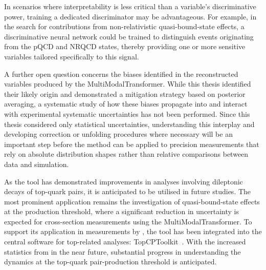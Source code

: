 In scenarios where interpretability is less critical than a variable's discriminative power, training a dedicated discriminator may be advantageous. For example, in the search for contributions from non-relativistic quasi-bound-state effects, a discriminative neural network could be trained to distinguish events originating from the pQCD and NRQCD states, thereby providing one or more sensitive variables tailored specifically to this signal.

A further open question concerns the biases identified in the reconstructed variables produced by the MultiModalTransformer. While this thesis identified their likely origin and demonstrated a mitigation strategy based on posterior averaging, a systematic study of how these biases propagate into and interact with experimental systematic uncertainties has not been performed. Since this thesis considered only statistical uncertainties, understanding this interplay and developing correction or unfolding procedures where necessary will be an important step before the method can be applied to precision measurements that rely on absolute distribution shapes rather than relative comparisons between data and simulation.

As the tool has demonstrated improvements in analyses involving dileptonic decays of top-quark pairs, it is anticipated to be utilised in future studies. The most prominent application remains the investigation of quasi-bound-state effects at the \ttbar production threshold, where a significant reduction in uncertainty is expected for cross-section measurements using the MultiModalTransformer. To support its application in measurements by \atlas, the tool has been integrated into the central software for top-related analyses: TopCPToolkit~\cite{topcptoolkit}. With the increased statistics from \LHCruniii in the near future, substantial progress in understanding the dynamics at the top-quark pair-production threshold is anticipated.


